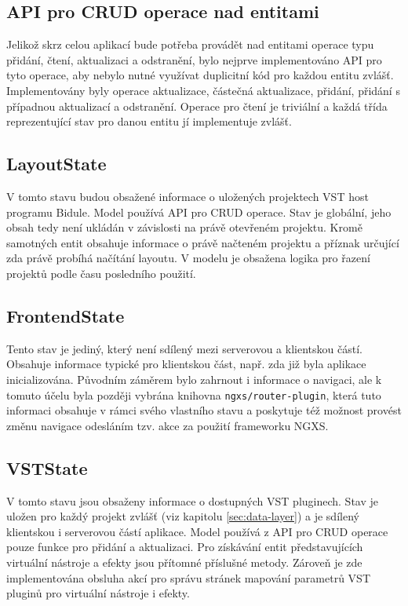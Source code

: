 \documentclass[thesis=M,czech]{FITthesis}[2019/03/06]
\begin{document}
		\subsection{API pro CRUD operace nad entitami}
			Jelikož skrz celou aplikací bude potřeba provádět nad entitami operace typu přidání, čtení, aktualizaci a odstranění, bylo nejprve implementováno API pro tyto operace, aby nebylo nutné využívat duplicitní
			kód pro každou entitu zvlášť. Implementovány byly operace aktualizace, částečná aktualizace, přidání,
			přidání s případnou aktualizací a odstranění. Operace pro čtení je triviální a každá třída reprezentující
			stav pro danou entitu jí implementuje zvlášť.						
		
		\subsection{LayoutState}
			V tomto stavu budou obsažené informace o uložených projektech VST host programu Bidule.
			Model používá API pro CRUD operace. Stav je globální, jeho obsah tedy není ukládán
			v závislosti na právě otevřeném projektu. Kromě samotných entit obsahuje informace o 
			právě načteném projektu a příznak určující zda právě probíhá načítání layoutu.
			V modelu je obsažena logika pro řazení projektů podle času posledního použití.			
			
		\subsection{FrontendState}
			Tento stav je jediný, který není sdílený mezi serverovou a klientskou částí.
			Obsahuje informace typické pro klientskou část, např. zda již byla aplikace inicializována.
			Původním záměrem bylo zahrnout i informace o navigaci, ale k tomuto
			účelu byla později vybrána knihovna \texttt{ngxs/router-plugin}, která tuto informaci
			obsahuje v rámci svého vlastního stavu a poskytuje též možnost provést změnu navigace
			odesláním tzv. akce za použití frameworku NGXS.
		
		\subsection{VSTState}
			V tomto stavu jsou obsaženy informace o dostupných VST pluginech. Stav je uložen 
			pro každý projekt zvlášť (viz kapitolu \ref{sec:data-layer}) a je sdílený klientskou i serverovou částí aplikace.
			Model používá z API pro CRUD operace pouze funkce pro přidání a aktualizaci.
			Pro získávání entit představujících virtuální nástroje a efekty jsou přítomné příslušné metody.
			Zároveň je zde implementována obsluha akcí pro správu stránek mapování parametrů
			VST pluginů pro virtuální nástroje i efekty.
					
\end{document}
